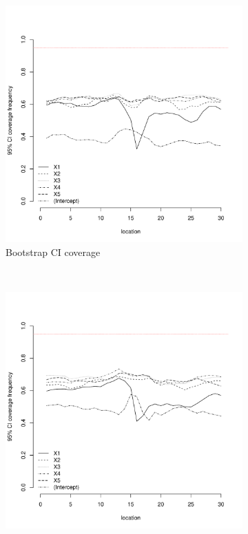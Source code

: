 \documentclass[authoryear, review, 11pt]{elsarticle}
\begin{document}
\begin{figure}
	\vspace{-30mm}
	\centering
	\begin{subfigure}[b]{0.45\textwidth}
	\centering
		\includegraphics[width=\textwidth]{../../figures/simulation/15.29.profile_bootstrap_coverage.pdf}
		\caption{Bootstrap CI coverage}
	\end{subfigure}%
	~ %
	\begin{subfigure}[b]{0.45\textwidth}
	\centering
		\includegraphics[width=\textwidth]{../../figures/simulation/15.29.profile_se_coverage.pdf}

\end{subfigure}
\end{figure}
\end{document}
